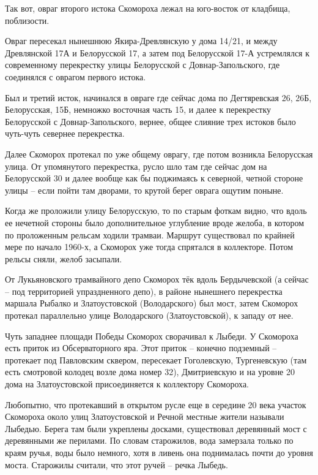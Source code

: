 Так вот, овраг второго истока Скомороха лежал на юго-восток от кладбища, поблизости.

Овраг пересекал нынешнюю Якира-Древля\-нскую у дома 14/21, и между Древлянской 17А и Белорусской 17, а затем под Белорусской 17-А устремлялся к современному перекрестку улицы Белорусской с Довнар-Запольского, где соединялся с оврагом первого истока.

Был и третий исток, начинался в овраге где сейчас дома по Дегтяревская 26, 26Б, Белорусская, 15Б, немножко восточная часть 15, и далее к перекрестку Белорусской с Довнар-Запольского, вернее, общее слияние трех истоков было чуть-чуть севернее перекрестка.

Далее Скоморох протекал по уже общему оврагу, где потом возникла Белорусская улица. От упомянутого перекрестка, русло шло там где сейчас дом на Белорусской 30 и далее вообще как бы поджимаясь к северной, четной стороне улицы – если пойти там дворами, то крутой берег оврага ощутим поныне.

Когда же проложили улицу Белорусскую, то по старым фоткам видно, что вдоль ее нечетной стороны было дополнительное углубление вроде желоба, в котором по проложенным рельсам ходили трамваи. Маршрут существовал по крайней мере по начало 1960-х, а Скоморох уже тогда спрятался в коллекторе. Потом рельсы сняли, желоб засыпали.

От Лукьяновского трамвайного депо Скоморох тёк вдоль Бердычевской (а сейчас – под территорией упраздненного депо), в районе нынешнего перекрестка маршала Рыбалко и Златоустовской (Володарского) был мост, затем Скоморох протекал параллельно улице Володарского (Златоустовской), к западу от нее.

Чуть западнее площади Победы Скоморох сворачивал к Лыбеди. У Скомороха есть приток из Обсерваторного яра. Этот приток – конечно подземный – протекает под Павловским сквером, пересекает Гоголевскую, Тургеневскую (там есть смотровой колодец возле дома номер 32), Дмитриевскую и на уровне 20 дома на Златоустовской присоединяется к коллектору Скомороха.

Любопытно, что протекавший в открытом русле еще в середине 20 века участок Скомороха около улиц Златоустовской и Речной местные жители называли Лыбедью. Берега там были укреплены досками, существовал деревянный мост с деревянными же перилами. По словам старожилов, вода замерзала только по краям ручья, воды было немного, хотя в ливень она поднималась почти до уровня моста. Старожилы считали, что этот ручей – речка Лыбедь. 

